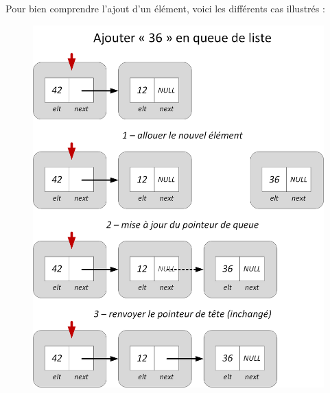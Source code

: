 \documentclass[11pt,a4paper]{article}
\begin{document}
\bigskip

Pour bien comprendre l'ajout d'un élément, voici les différents cas illustrés :

\vfillFirst

\begin{figure}[ht!]
\centering
\centerline{   %
\includegraphics[scale=0.85]{img/listes/Listes_Pointeurs_3_1_ajout_queue.png}
}
\end{figure}

\vfillLast

\pagebreak

\vfillFirst
\end{document}
